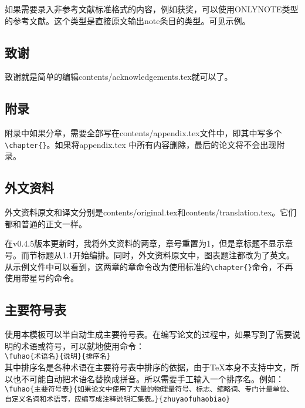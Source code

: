 如果需要录入非参考文献标准格式的内容，例如获奖，可以使用ONLYNOTE类型的参考文献。这个类型是直接原文输出note条目的类型。可见示例\cite{onlynoteexample}。
\subsection{致谢}
致谢就是简单的编辑contents/acknowledgements.tex就可以了。
\subsection{附录}
附录中如果分章，需要全部写在contents/appendix.tex文件中，即其中写多个\verb|\chapter{}|。如果将appendix.tex 中所有内容删除，最后的论文将不会出现附录。
\subsection{外文资料}
\label{translation}
外文资料原文和译文分别是contents/original.tex和contents/translation.tex。它们都和普通的正文一样。

在v0.4.5版本更新时，我将外文资料的两章，章号重置为1，但是章标题不显示章号。而节标题从1.1开始编排。同时，外文资料原文中，图表题注都改为了英文。从示例文件中可以看到，这两章的章命令改为使用标准的\verb|\chapter{}|命令，不再使用带星号的命令。
\subsection{主要符号表}
使用本模板可以半自动生成主要符号表。在编写论文的过程中，如果写到了需要说明的术语或符号，可以就地使用命令：\\
\verb|\fuhao{术语名}{说明}{排序名}|\\
其中排序名是各种术语在主要符号表中排序的依据，由于\TeX{}本身不支持中文，所以也不可能自动把术语名替换成拼音。所以需要手工输入一个排序名。例如：\\
\verb|\fuhao{主要符号表}{如果论文中使用了大量的物理量符号、标志、缩略词、专门计量单位、自定义名词和术语等，应编写成注释说明汇集表。}{zhuyaofuhaobiao}|\\

